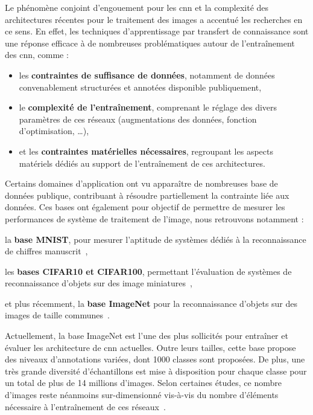 Le phénomène conjoint d'engouement pour les \gls{cnn} et la complexité des architectures récentes pour le traitement des images a accentué les recherches en ce sens. En effet, les techniques d'apprentissage par transfert de connaissance sont une réponse efficace à de nombreuses problématiques autour de l'entraînement des \gls{cnn}, comme : 
\begin{itemize}
    \item les \textbf{contraintes de suffisance de données}, notamment de données convenablement structurées et annotées disponible publiquement,
    \item le \textbf{complexité de l'entraînement}, comprenant le réglage des divers paramètres de ces réseaux (augmentations des données, fonction d'optimisation, \ldots),
    \item et les \textbf{contraintes matérielles nécessaires}, regroupant les aspects matériels dédiés au support de l'entraînement de ces architectures.
\end{itemize}\par

Certains domaines d'application ont vu apparaître de nombreuses base de données publique, contribuant à résoudre partiellement la contrainte liée aux données. Ces bases ont également pour objectif de permettre de mesurer les performances de système de traitement de l'image, nous retrouvons notamment : 
\begin{inlinerate}
    \item la \textbf{base MNIST}, pour mesurer l'aptitude de systèmes dédiés à la reconnaissance de chiffres manuscrit~\cite{lecun2010},
    \item les \textbf{bases CIFAR10 et CIFAR100}, permettant l'évaluation de systèmes de reconnaissance d'objets sur des image miniatures~\cite{Krizhevsky}, 
    \item et plus récemment, la \textbf{base ImageNet} pour la reconnaissance d'objets sur des images de taille communes~\cite{Deng2008}. 
\end{inlinerate}\par

Actuellement, la base ImageNet est l'une des plus sollicités pour entraîner et évaluer les architecture de \gls{cnn} actuelles. Outre leurs tailles, cette base propose des niveaux d'annotations variées, dont 1000 classes sont proposées. De plus, une très grande diversité d'échantillons est mise à disposition pour chaque classe pour un total de plus de 14 millions d'images. Selon certaines études, ce nombre d'images reste néanmoins sur-dimensionné vis-à-vis du nombre d'éléments nécessaire à l'entraînement de ces réseaux~\cite{Huh2016}.\par


